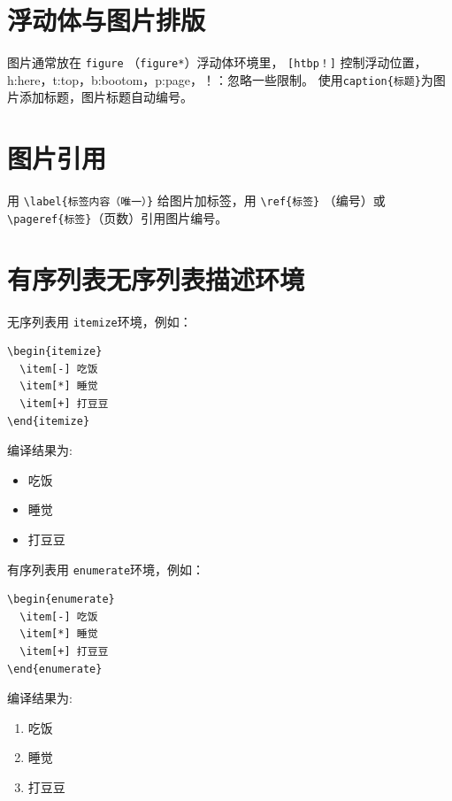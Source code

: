 \documentclass[12pt,a4paper]{ctexart}
\begin{document}
\section{浮动体与图片排版}
图片通常放在 \verb|figure| （\verb|figure*|）浮动体环境里，
\verb|[htbp！]| 控制浮动位置，h:here，t:top，b:bootom，p:page，！：忽略一些限制。
使用\verb|caption{标题}|为图片添加标题，图片标题自动编号。

\section{图片引用}
用 \verb|\label{标签内容（唯一）}| 给图片加标签，用 \verb|\ref{标签}| （编号）或\verb|\pageref{标签}|（页数）引用图片编号。


\section{有序列表无序列表描述环境}
无序列表用 \verb|itemize|环境，例如：

\begin{verbatim}
\begin{itemize}
  \item[-] 吃饭
  \item[*] 睡觉
  \item[+] 打豆豆
\end{itemize}
\end{verbatim}
编译结果为:
\begin{itemize}
  \item[-] 吃饭
  \item[*] 睡觉
  \item[+] 打豆豆
\end{itemize}

有序列表用 \verb|enumerate|环境，例如：
\begin{verbatim}
\begin{enumerate}
  \item[-] 吃饭
  \item[*] 睡觉
  \item[+] 打豆豆
\end{enumerate}
\end{verbatim}
编译结果为:
\begin{enumerate}
  \item 吃饭
  \item 睡觉
  \item 打豆豆
\end{enumerate}
\end{document}
